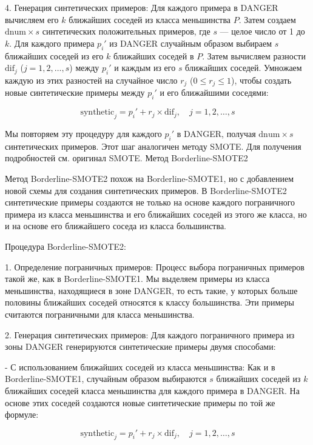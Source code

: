 \documentclass{article}
\begin{document}
4. Генерация синтетических примеров: Для каждого примера в DANGER вычисляем его \( k \) ближайших соседей из класса меньшинства \( P \). Затем создаем \(\text{dnum} \times s\) синтетических положительных примеров, где \( s \) — целое число от 1 до \( k \). Для каждого примера \( p_i' \) из DANGER случайным образом выбираем \( s \) ближайших соседей из его \( k \) ближайших соседей в \( P \). Затем вычисляем разности \( \text{dif}_j \) (\( j = 1, 2, \dots, s \)) между \( p_i' \) и каждым из его \( s \) ближайших соседей. Умножаем каждую из этих разностей на случайное число \( r_j \) (\( 0 \leq r_j \leq 1 \)), чтобы создать новые синтетические примеры между \( p_i' \) и его ближайшими соседями:

\[
\text{synthetic}_j = p_i' + r_j \times \text{dif}_j, \quad j = 1, 2, \dots, s
\]

Мы повторяем эту процедуру для каждого \( p_i' \) в DANGER, получая \(\text{dnum} \times s\) синтетических примеров. Этот шаг аналогичен методу SMOTE. Для получения подробностей см. оригинал SMOTE.
Метод Borderline-SMOTE2

Метод Borderline-SMOTE2 похож на Borderline-SMOTE1, но с добавлением новой схемы для создания синтетических примеров. В Borderline-SMOTE2 синтетические примеры создаются не только на основе каждого пограничного примера из класса меньшинства и его ближайших соседей из этого же класса, но и на основе его ближайшего соседа из класса большинства. 

Процедура Borderline-SMOTE2:

1. Определение пограничных примеров: Процесс выбора пограничных примеров такой же, как в Borderline-SMOTE1. Мы выделяем примеры из класса меньшинства, находящиеся в зоне DANGER, то есть такие, у которых больше половины ближайших соседей относятся к классу большинства. Эти примеры считаются пограничными для класса меньшинства.

2. Генерация синтетических примеров: Для каждого пограничного примера из зоны DANGER генерируются синтетические примеры двумя способами:

   - С использованием ближайших соседей из класса меньшинства: Как и в Borderline-SMOTE1, случайным образом выбираются \( s \) ближайших соседей из \( k \) ближайших соседей класса меньшинства для каждого примера в DANGER. На основе этих соседей создаются новые синтетические примеры по той же формуле:

     \[
     \text{synthetic}_j = p_i' + r_j \times \text{dif}_j, \quad j = 1, 2, \dots, s
     \]
\end{document}
